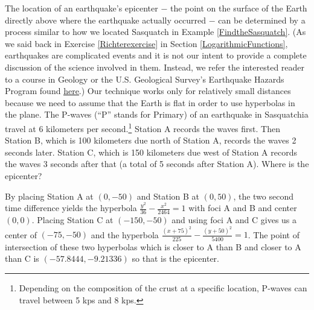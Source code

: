 \documentclass{ximera}
\begin{document}
\begin{problem}
The location of an earthquake's epicenter $-$ the point on the surface of the Earth directly above where the earthquake actually occurred $-$ can be determined by a process similar to how we located Sasquatch in Example \ref{FindtheSasquatch}.  (As we said back in Exercise \ref{Richterexercise} in Section \ref{LogarithmicFunctions}, earthquakes are complicated events and it is not our intent to provide a complete discussion of the science involved in them.  Instead, we refer the interested reader to a course in Geology or the U.S. Geological Survey's Earthquake Hazards Program found \href{http://earthquake.usgs.gov/}{\underline{here}}.)  Our technique works only for relatively small distances because we need to assume that the Earth is flat in order to use hyperbolas in the plane.  The P-waves (``P'' stands for Primary) of an earthquake in Sasquatchia travel at 6 kilometers per second.\footnote{Depending on the composition of the crust at a specific location, P-waves can travel between 5 kps and 8 kps.}  Station A records the waves first. Then Station B, which is 100 kilometers due north of Station A, records the waves 2 seconds later.  Station C, which is 150 kilometers due west of Station A records the waves 3 seconds after that (a total of 5 seconds after Station A). Where is the epicenter?

\begin{solution}
    By placing Station A at $(0, -50)$ and Station B at $(0, 50)$, the two second time difference yields the hyperbola $\frac{y^{2}}{36} - \frac{x^{2}}{2464} = 1$ with foci A and B and center $(0, 0)$.  Placing Station C at $(-150, -50)$ and using foci A and C gives us a center of $(-75, -50)$ and the hyperbola $\frac{(x + 75)^{2}}{225} - \frac{(y + 50)^{2}}{5400} = 1$.  The point of intersection of these two hyperbolas which is closer to A than B and closer to A than C is $(-57.8444, -9.21336)$ so that is the epicenter.  
\end{solution}

\end{problem}
\end{document}
